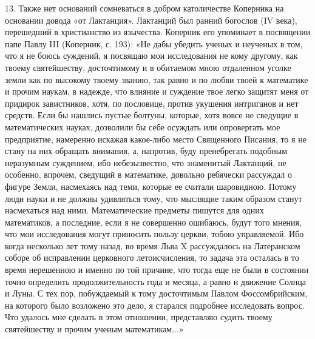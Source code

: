 13. Также  нет оснований  сомневаться в добром  католичестве Коперника
на  основании довода  «от  Лактанция». Лактанций  был ранний  богослов
(IV  века),  перешедший  в  христианство из  язычества.  Коперник  его
упоминает в  посвящении папе  Павлу III (Коперник,  с. 193):  «Не дабы
убедить  ученых  и  неученых  в  том,  что  я  не  боюсь  суждений,  я
посвящаю мои  исследования не  кому другому, как  твоему святейшеству,
досточтимому  и  в  обитаемом  мною отдаленном  уголке  земли  как  по
высокому твоему  званию, так  равно и  по любви  твоей к  математике и
прочим наукам,  в надежде, что  влияние и суждение твое  легко защитят
меня  от придирок  завистников,  хотя, по  пословице, против  укушения
интриганов и  нет средств.  Если бы  нашлись пустые  болтуны, которые,
хотя  вовсе не  сведущие в  математических науках,  дозволили бы  себе
осуждать или опровергать мое предприятие, намеренно искажая какое-либо
место  Священного Писания,  то я  не стану  на них  обращать внимания,
а,  напротив, буду  пренебрегать  подобным  неразумным суждением,  ибо
небезызвестно,  что   знаменитый  Лактанций,  не   особенно,  впрочем,
сведущий в  математике, довольно  ребячески рассуждал о  фигуре Земли,
насмехаясь над теми, которые ее  считали шаровидною. Потому люди науки
и  не  должны  удивляться  тому, что  мыслящие  таким  образом  станут
насмехаться  над  ними.  Математические  предметы  пишутся  для  одних
математиков,  а  последние,  если  я  не  совершенно  ошибаюсь,  будут
того  мнения,  что мои  исследования  могут  приносить пользу  церкви,
тобою  управляемой.  Ибо когда  несколько  лет  тому назад,  во  время
Льва X  рассуждалось на  Латеранском соборе об  исправлении церковного
летоисчисления, то задача эта осталась  в то время нерешенною и именно
по той  причине, что тогда  еще не  были в состоянии  точно определить
продолжительность года и  месяца, а равно и движение Солнца  и Луны. С
тех  пор, побуждаемый  к  тому досточтимым  Павлом Фоссомбрийским,  на
которого  было возложено  это дело,  я старался  подробнее исследовать
вопрос. Что удалось  мне сделать в этом  отношении, представляю судить
твоему святейшеству и прочим ученым математикам...»

